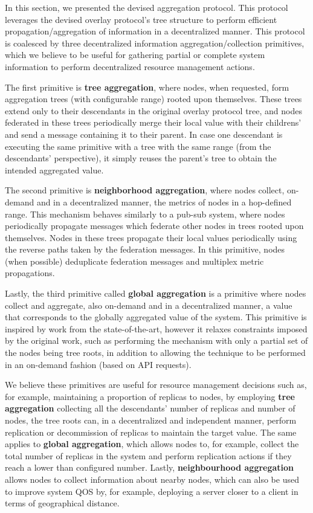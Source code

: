 In this section, we presented the devised aggregation protocol. This protocol leverages the devised overlay protocol's tree structure to perform efficient propagation/aggregation of information in a decentralized manner. This protocol is coalesced by three decentralized information aggregation/collection primitives, which we believe to be useful for gathering partial or complete system information to perform decentralized resource management actions. 

The first primitive is \textbf{tree aggregation}, where nodes, when requested, form aggregation trees (with configurable range) rooted upon themselves. These trees extend only to their descendants in the original overlay protocol tree, and nodes federated in these trees periodically merge their local value with their childrens' and send a message containing it to their parent. In case one descendant is executing the same primitive with a tree with the same range (from the descendants' perspective), it simply reuses the parent's tree to obtain the intended aggregated value. 

The second primitive is \textbf{neighborhood aggregation}, where nodes collect, on-demand and in a decentralized manner, the metrics of nodes in a hop-defined range. This mechanism behaves similarly to a pub-sub system, where nodes periodically propagate messages which federate other nodes in trees rooted upon themselves. Nodes in these trees propagate their local values periodically using the reverse paths taken by the federation messages. In this primitive, nodes (when possible) deduplicate federation messages and multiplex metric propagations.

Lastly, the third primitive called \textbf{global aggregation} is a primitive where nodes collect and aggregate, also on-demand and in a decentralized manner, a value that corresponds to the globally aggregated value of the system. This primitive is inspired by work from the state-of-the-art, however it relaxes constraints imposed by the original work, such as performing the mechanism with only a partial set of the nodes being tree roots, in addition to allowing the technique to be performed in an on-demand fashion (based on API requests).

We believe these primitives are useful for resource management decisions such as, for example, maintaining a proportion of replicas to nodes, by employing \textbf{tree aggregation} collecting all the descendants' number of replicas and number of nodes, the tree roots can, in a decentralized and independent manner, perform replication or decommission of replicas to maintain the target value. The same applies to \textbf{global aggregation}, which allows nodes to, for example, collect the total number of replicas in the system and perform replication actions if they reach a lower than configured number. Lastly, \textbf{neighbourhood aggregation} allows nodes to collect information about nearby nodes, which can also be used to improve system QOS by, for example, deploying a server closer to a client in terms of geographical distance.

